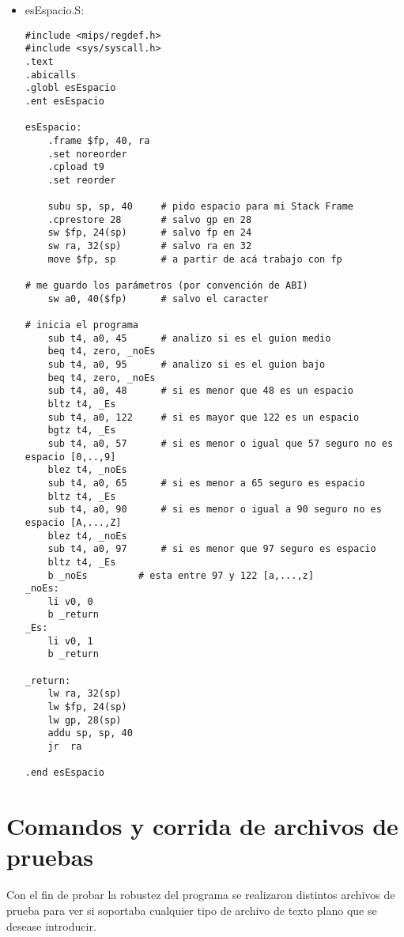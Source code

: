 \documentclass[a4paper,10pt]{article}
\begin{document}
\begin{itemize}
\begin{verbatim}
.end palindromeString

.rdata

SALTO: .asciiz "\n"

\end{verbatim}
\item esEspacio.S: \\
\begin{verbatim}
#include <mips/regdef.h>
#include <sys/syscall.h>
.text
.abicalls
.globl esEspacio
.ent esEspacio

esEspacio:
	.frame $fp, 40, ra
	.set noreorder
	.cpload t9
	.set reorder

	subu sp, sp, 40 	# pido espacio para mi Stack Frame
	.cprestore 28		# salvo gp en 28
	sw $fp, 24(sp)		# salvo fp en 24
	sw ra, 32(sp)		# salvo ra en 32
	move $fp, sp		# a partir de acá trabajo con fp
	
# me guardo los parámetros (por convención de ABI)
	sw a0, 40($fp)		# salvo el caracter

# inicia el programa
	sub t4, a0, 45		# analizo si es el guion medio
	beq t4, zero, _noEs		
	sub t4, a0, 95		# analizo si es el guion bajo
	beq t4, zero, _noEs
	sub t4, a0, 48		# si es menor que 48 es un espacio
	bltz t4, _Es
	sub t4, a0, 122		# si es mayor que 122 es un espacio
	bgtz t4, _Es
	sub t4, a0, 57		# si es menor o igual que 57 seguro no es espacio [0,..,9]
	blez t4, _noEs
	sub t4, a0, 65		# si es menor a 65 seguro es espacio
	bltz t4, _Es
	sub t4, a0, 90		# si es menor o igual a 90 seguro no es espacio [A,...,Z]
	blez t4, _noEs
	sub t4, a0, 97		# si es menor que 97 seguro es espacio
	bltz t4, _Es
	b _noEs			# esta entre 97 y 122 [a,...,z]
_noEs:
	li v0, 0
	b _return
_Es:
	li v0, 1
	b _return

_return:
	lw ra, 32(sp)
	lw $fp, 24(sp)
	lw gp, 28(sp)
	addu sp, sp, 40
	jr	ra

.end esEspacio

\end{verbatim}
\end{itemize}


\section{Comandos y corrida de archivos de pruebas}
Con el fin de probar la robustez del programa se realizaron distintos archivos de prueba para ver si soportaba cualquier tipo de archivo de texto plano que se desease introducir.
\end{document}

